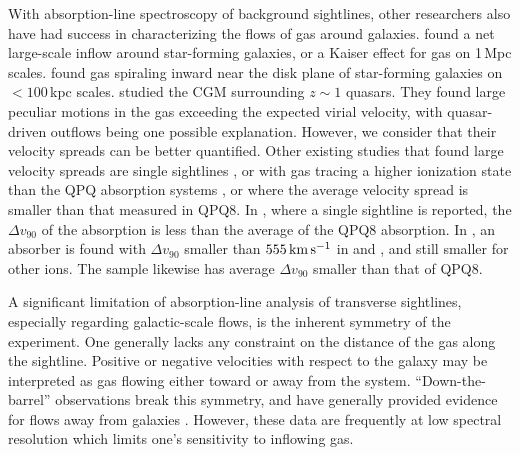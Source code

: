 \documentclass[iop]{emulateapj}
\begin{document}
With absorption-line spectroscopy of background sightlines, other researchers also have had
success in characterizing the flows of gas around galaxies. \cite{Rakic+12} found a net
large-scale inflow around star-forming galaxies, or a Kaiser effect for gas on
1\,Mpc scales. \cite{Ho+17} found gas spiraling inward near the disk plane of
star-forming galaxies on $<100$\,kpc scales. \cite{Johnson+15} studied the CGM surrounding
$z\sim1$ quasars. They found large peculiar motions in the gas exceeding the expected virial
velocity, with quasar-driven outflows being one possible explanation. However, we consider that
their velocity spreads can be better quantified. Other
existing studies that found large velocity spreads are single sightlines
\citep[e.g.,][]{Tripp+11,RudieNewmanMurphy17}, or with gas tracing
a higher ionization state than the QPQ absorption systems \citep[e.g.,][]{Churchill+12}, or where
the average velocity spread is smaller than that measured in QPQ8. In \cite{Gauthier13}, where a
single sightline is reported, the $\Delta v_{90}$ of the  absorption is less than the
average of the QPQ8  absorption. In \cite{Muzahid+15}, an absorber is found with
$\Delta v_{90}$ smaller than $555\,{\rm km\,s^{-1}}$ in  and , and still
smaller for other ions. The \cite{Zahedy+16} sample likewise has average $\Delta v_{90}$ smaller
than that of QPQ8.

A significant limitation of absorption-line analysis of transverse sightlines, especially
regarding galactic-scale flows, is the inherent symmetry of the experiment. One generally lacks
any constraint on the distance of the gas along the sightline. Positive or negative velocities
with respect to the galaxy may be interpreted as gas flowing either toward or away from the
system. ``Down-the-barrel'' observations break this symmetry, and have generally provided evidence
for flows away from galaxies \citep{Rupke+05,Martin05,Weiner+09,Rubin+14}. However, these data are
frequently at low spectral resolution which limits one's sensitivity to inflowing gas.
\end{document}
